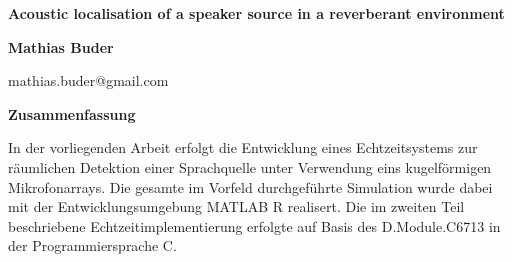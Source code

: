 



\begin{titlepage}
	\begin{center}

		\vspace*{2cm}
		\huge
		\textbf{Acoustic localisation of a speaker source in a reverberant environment}

		\vspace{2.5cm}
		\large
		\textbf{Mathias Buder}

		\vspace{0.25cm}
		\small
		\textnormal{mathias.buder@gmail.com}
		

		\vspace{3 cm}

		\textbf{Zusammenfassung}

	\end{center}

In der vorliegenden Arbeit erfolgt die Entwicklung eines Echtzeitsystems zur
räumlichen Detektion einer Sprachquelle unter Verwendung eins kugelförmigen
Mikrofonarrays. Die gesamte im Vorfeld durchgeführte Simulation wurde dabei
mit der Entwicklungsumgebung MATLAB R realisert. Die im zweiten Teil beschriebene Echtzeitimplementierung erfolgte auf Basis des D.Module.C6713 in
der Programmiersprache C.

\end{titlepage}

	\tableofcontents								%
	\listoftables									%
	\listoffigures									%
	\lstlistoflistings

